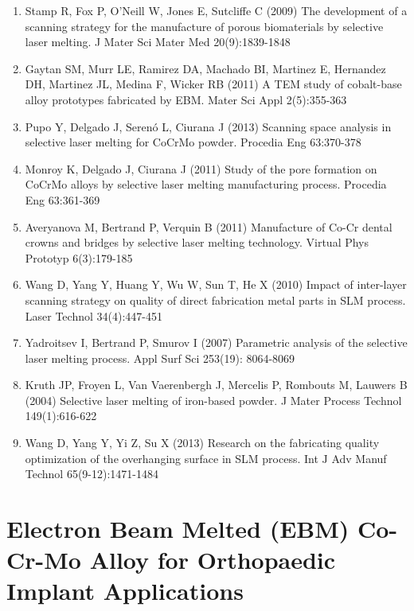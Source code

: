 \documentclass[10pt]{article}
\begin{document}
\begin{enumerate}
  \item Stamp R, Fox P, O'Neill W, Jones E, Sutcliffe C (2009) The development of a scanning strategy for the manufacture of porous biomaterials by selective laser melting. J Mater Sci Mater Med 20(9):1839-1848

  \item Gaytan SM, Murr LE, Ramirez DA, Machado BI, Martinez E, Hernandez DH, Martinez JL, Medina F, Wicker RB (2011) A TEM study of cobalt-base alloy prototypes fabricated by EBM. Mater Sci Appl 2(5):355-363

  \item Pupo Y, Delgado J, Serenó L, Ciurana J (2013) Scanning space analysis in selective laser melting for CoCrMo powder. Procedia Eng 63:370-378

  \item Monroy K, Delgado J, Ciurana J (2011) Study of the pore formation on CoCrMo alloys by selective laser melting manufacturing process. Procedia Eng 63:361-369

  \item Averyanova M, Bertrand P, Verquin B (2011) Manufacture of Co-Cr dental crowns and bridges by selective laser melting technology. Virtual Phys Prototyp 6(3):179-185

  \item Wang D, Yang Y, Huang Y, Wu W, Sun T, He X (2010) Impact of inter-layer scanning strategy on quality of direct fabrication metal parts in SLM process. Laser Technol 34(4):447-451

  \item Yadroitsev I, Bertrand P, Smurov I (2007) Parametric analysis of the selective laser melting process. Appl Surf Sci 253(19): 8064-8069

  \item Kruth JP, Froyen L, Van Vaerenbergh J, Mercelis P, Rombouts M, Lauwers B (2004) Selective laser melting of iron-based powder. J Mater Process Technol 149(1):616-622

  \item Wang D, Yang Y, Yi Z, Su X (2013) Research on the fabricating quality optimization of the overhanging surface in SLM process. Int $\mathrm{J}$ Adv Manuf Technol 65(9-12):1471-1484

\end{enumerate}

\section*{Electron Beam Melted (EBM) Co-Cr-Mo Alloy for Orthopaedic Implant Applications }
\end{document}
